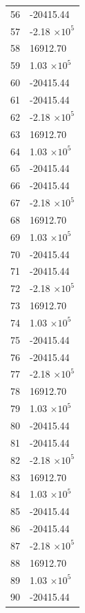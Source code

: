 \documentclass[a4paper,11pt]{article}
\begin{document}
\begin{center}
\begin{longtable}{|R{1.5cm}|R{2.5cm}|}
   56 &    -20415.44 \\
   57 &        -2.18 $\times 10^{           5}$ \\
   58 &     16912.70 \\
   59 &         1.03 $\times 10^{           5}$ \\
   60 &    -20415.44 \\
   61 &    -20415.44 \\
   62 &        -2.18 $\times 10^{           5}$ \\
   63 &     16912.70 \\
   64 &         1.03 $\times 10^{           5}$ \\
   65 &    -20415.44 \\
   66 &    -20415.44 \\
   67 &        -2.18 $\times 10^{           5}$ \\
   68 &     16912.70 \\
   69 &         1.03 $\times 10^{           5}$ \\
   70 &    -20415.44 \\
   71 &    -20415.44 \\
   72 &        -2.18 $\times 10^{           5}$ \\
   73 &     16912.70 \\
   74 &         1.03 $\times 10^{           5}$ \\
   75 &    -20415.44 \\
   76 &    -20415.44 \\
   77 &        -2.18 $\times 10^{           5}$ \\
   78 &     16912.70 \\
   79 &         1.03 $\times 10^{           5}$ \\
   80 &    -20415.44 \\
   81 &    -20415.44 \\
   82 &        -2.18 $\times 10^{           5}$ \\
   83 &     16912.70 \\
   84 &         1.03 $\times 10^{           5}$ \\
   85 &    -20415.44 \\
   86 &    -20415.44 \\
   87 &        -2.18 $\times 10^{           5}$ \\
   88 &     16912.70 \\
   89 &         1.03 $\times 10^{           5}$ \\
   90 &    -20415.44 \\

\end{longtable}
\end{center}
\end{document}
